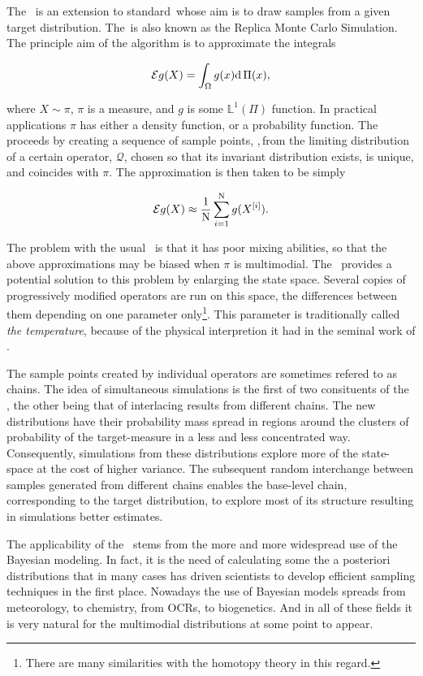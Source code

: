 \label{Introduction}

The \PTalgo\, is an extension to standard \MHalgo\,whose aim is to draw samples from a given target distribution. The \PTalgo\,is also known as the Replica Monte Carlo Simulation. The principle aim of the algorithm is to approximate the integrals 

\begin{equation*}
	\mathcal{E} g(X) = \int_\Omega g(x) \mathrm{d }\,\Pi(x),
\end{equation*}

where $X\sim \pi$, $\pi$ is a measure, and $g$ is some $\mathbb{L}^1(\Pi)$ function. In practical applications $\pi$ has either a density function, or a probability function. The \MHalgo\, proceeds by creating a sequence of sample points, \sample,\,from the limiting distribution of a certain operator, $\mathcal{Q}$, chosen so that its invariant distribution exists, is unique, and coincides with $\pi$. The approximation is then taken to be simply

\begin{equation*}
	\mathcal{E} g(X) \approx \frac{1}{\mathrm{N}}\sum_{i = 1}^{\mathrm{N}} g(X^{[i]}).
\end{equation*}

The problem with the usual \MHalgo\, is that it has poor mixing abilities, so that the above approximations may be biased when $\pi$ is multimodial. The \PT\, provides a potential solution to this problem by enlarging the state space. Several copies of progressively modified operators are run on this space, the differences between them depending on one parameter only\footnote{There are many similarities with the homotopy theory in this regard.}. This parameter is traditionally called {\it the temperature}, because of the physical interpretion it had in the seminal work of \citet{RobertSwendsen}. 

The sample points created by individual operators are sometimes refered to as chains. The idea of simultaneous simulations is the first of two consituents of the \PT, the other being that of interlacing results from different chains. The new distributions have their probability mass spread in regions around the clusters of probability of the target-measure in a less and less concentrated way. Consequently, simulations from these distributions explore more of the state-space at the cost of higher variance. The subsequent random interchange between samples generated from different chains enables the base-level chain, corresponding to the target distribution, to explore most of its structure resulting in simulations better estimates.

The applicability of the \PT\, stems from the more and more widespread use of the Bayesian modeling. In fact, it is the need of calculating some the a posteriori distributions that in many cases has driven scientists to develop efficient sampling techniques in the first place. Nowadays the use of Bayesian models spreads from meteorology, to chemistry, from OCRs, to biogenetics. And in all of these fields it is very natural for the multimodial distributions at some point to appear.